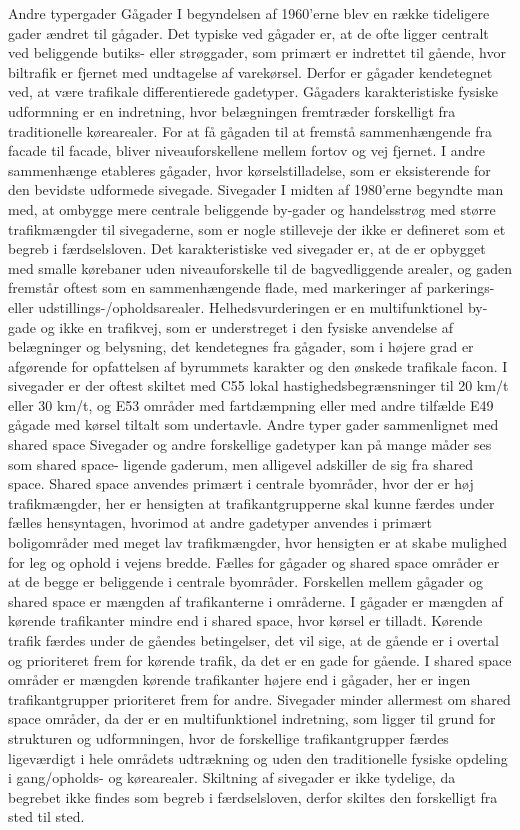 Andre typergader
Gågader
I begyndelsen af 1960’erne blev en række tideligere gader ændret til gågader. Det typiske ved gågader er, at de ofte ligger centralt ved beliggende butiks- eller strøggader, som primært er indrettet til gående, hvor biltrafik er fjernet med undtagelse af varekørsel. Derfor er gågader kendetegnet ved, at være trafikale differentierede gadetyper.
Gågaders karakteristiske fysiske udformning er en indretning, hvor belægningen fremtræder forskelligt fra traditionelle kørearealer. For at få gågaden til at fremstå sammenhængende fra facade til facade, bliver niveauforskellene mellem fortov og vej fjernet. I andre sammenhænge etableres gågader, hvor kørselstilladelse, som er eksisterende for den bevidste udformede sivegade.
Sivegader
I midten af 1980’erne begyndte man med, at ombygge mere centrale beliggende by-gader og handelsstrøg med større trafikmængder til sivegaderne, som er nogle stilleveje der ikke er defineret som et begreb i færdselsloven. Det karakteristiske ved sivegader er, at de er opbygget med smalle kørebaner uden niveauforskelle til de bagvedliggende arealer, og gaden fremstår oftest som en sammenhængende flade, med markeringer af parkerings- eller udstillings-/opholdsarealer. Helhedsvurderingen er en multifunktionel by-gade og ikke en trafikvej, som er understreget i den fysiske anvendelse af belægninger og belysning, det kendetegnes fra gågader, som i højere grad er afgørende for opfattelsen af byrummets karakter og den ønskede trafikale facon. I sivegader er der oftest skiltet med C55 lokal hastighedsbegrænsninger til 20 km/t eller 30 km/t, og E53 områder med fartdæmpning eller med andre tilfælde E49 gågade med kørsel tiltalt som undertavle.
Andre typer gader sammenlignet med shared space
Sivegader og andre forskellige gadetyper kan på mange måder ses som shared space- ligende gaderum, men alligevel adskiller de sig fra shared space. Shared space anvendes primært i centrale byområder, hvor der er høj trafikmængder, her er hensigten at trafikantgrupperne skal kunne færdes under fælles hensyntagen, hvorimod at andre gadetyper anvendes i primært boligområder med meget lav trafikmængder, hvor hensigten er at skabe mulighed for leg og ophold i vejens bredde.
Fælles for gågader og shared space områder er at de begge er beliggende i centrale byområder. Forskellen mellem gågader og shared space er mængden af trafikanterne i områderne. I gågader er mængden af kørende trafikanter mindre end i shared space, hvor kørsel er tilladt. Kørende trafik færdes under de gåendes betingelser, det vil sige, at de gående er i overtal og prioriteret frem for kørende trafik, da det er en gade for gående. I shared space områder er mængden kørende trafikanter højere end i gågader, her er ingen trafikantgrupper prioriteret frem for andre.
Sivegader minder allermest om shared space områder, da der er en multifunktionel indretning, som ligger til grund for strukturen og udformningen, hvor de forskellige trafikantgrupper færdes ligeværdigt i hele områdets udtrækning og uden den traditionelle fysiske opdeling i gang/opholds- og kørearealer. Skiltning af sivegader er ikke tydelige, da begrebet ikke findes som begreb i færdselsloven, derfor skiltes den forskelligt fra sted til sted.


